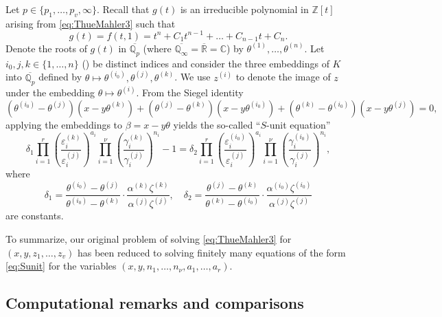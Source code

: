 Let $p \in \{p_1, \dots, p_v, \infty\}$. Recall that $g(t)$ is an irreducible polynomial in $\mathbb{Z}[t]$ arising from \eqref{eq:ThueMahler3} such that
\[g(t) = f(t,1) = t^n + C_1 t^{n-1} + \dots + C_{n-1}t + C_n.\]
Denote the roots of $g(t)$ in $\overline{\mathbb{Q}_p}$ (where $\overline{\mathbb{Q}_{\infty}} = \overline{\mathbb{R}} = \mathbb{C}$) by $\theta^{(1)}, \dots, \theta^{(n)}$. Let $i_0, j, k \in \{1,\dots, n\}$ () be distinct indices and consider the three embeddings of $K$ into $\overline{\mathbb{Q}_p}$ defined by $\theta \mapsto \theta^{(i_0)}, \theta^{(j)}, \theta^{(k)}$. We use $z^{(i)}$ to denote the image of $z$ under the embedding $\theta \mapsto \theta^{(i)}$. From the Siegel identity
\[(\theta^{(i_0)} - \theta^{(j)})(x-y\theta^{(k)}) + (\theta^{(j)} - \theta^{(k)})(x-y\theta^{(i_0)}) + (\theta^{(k)} - \theta^{(i_0)})(x-y\theta^{(j)}) = 0,\]
applying the embeddings to $\beta = x-y\theta$ yields the so-called ``$S$-unit equation''
\begin{equation} \label{eq:Sunit}
\delta_1 \prod_{i = 1}^r\left( \frac{\varepsilon_i^{(k)}}{\varepsilon_i^{(j)}}\right)^{a_i}\prod_{i = 1}^{\nu} \left( \frac{\gamma_i^{(k)}}{\gamma_i^{(j)}}\right)^{n_i} - 1 = \delta_2 \prod_{i = 1}^{r}\left( \frac{\varepsilon_i^{(i_0)}}{\varepsilon_i^{(j)}}\right)^{a_i} \prod_{i = 1}^{\nu} \left( \frac{\gamma_i^{(i_0)}}{\gamma_i^{(j)}}\right)^{n_i},
\end{equation}
where
\[\delta_1 = \frac{\theta^{(i_0)} - \theta^{(j)}}{\theta^{(i_0)} - \theta^{(k)}}\cdot\frac{\alpha^{(k)}\zeta^{(k)}}{\alpha^{(j)}\zeta^{(j)}}, \quad \delta_2 = \frac{\theta^{(j)} - \theta^{(k)}}{\theta^{(k)} - \theta^{(i_0)}}\cdot \frac{\alpha^{(i_0)}\zeta^{(i_0)}}{\alpha^{(j)}\zeta^{(j)}}\]
are constants. 

To summarize, our original problem of solving \eqref{eq:ThueMahler3} for $(x,y,z_1,\dots, z_v)$ has been reduced to solving finitely many equations of the form \eqref{eq:Sunit} for the variables $(x,y, n_1, \dots, n_{\nu},a_1,\dots,a_r)$.


\subsection{Computational remarks and comparisons}
\label{subsec:FactorizationRemarks}

